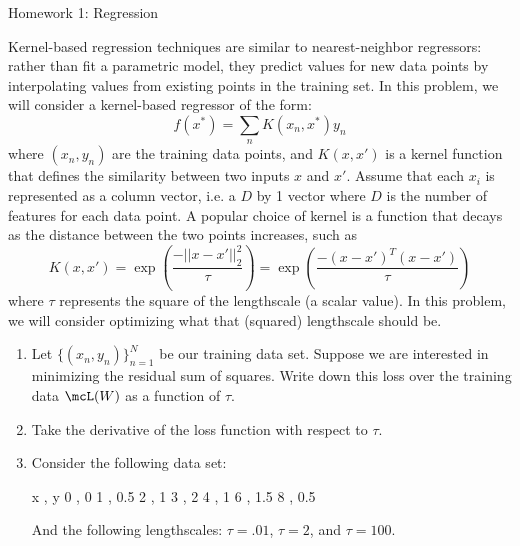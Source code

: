 \documentclass[submit]{harvardml}
\begin{document}
\begin{center}
{\Large Homework 1: Regression}\\
\end{center}



\begin{problem}

Kernel-based regression techniques are similar to nearest-neighbor
regressors: rather than fit a parametric model, they predict values
for new data points by interpolating values from existing points in
the training set.  In this problem, we will consider a kernel-based
regressor of the form:
\begin{equation*}
  f(x^*) = \sum_{n} K(x_n,x^*) y_n 
\end{equation*}
where $(x_n,y_n)$ are the training data points, and $K(x,x')$ is a
kernel function that defines the similarity between two inputs $x$ and
$x'$. Assume that each $x_i$ is represented as a column vector, i.e. a
$D$ by 1 vector where $D$ is the number of features for each data
point. A popular choice of kernel is a function that decays as the
distance between the two points increases, such as
\begin{equation*}
  K(x,x') = \exp\left(\frac{-||x-x'||^2_2}{\tau}\right) = \exp\left(\frac{-(x-x')^T (x-x')}{\tau} \right) 
\end{equation*}
where $\tau$ represents the square of the lengthscale (a scalar value).  In this
problem, we will consider optimizing what that (squared) lengthscale
should be.

\begin{enumerate}

\item Let $\{(x_n,y_n)\}_{n=1}^N$ be our training data set.  Suppose
  we are interested in minimizing the residual sum of squares.  Write
  down this loss over the training data $\mcL(W)$ as a function of $\tau$.

\item Take the derivative of the loss function with respect to $\tau$.

\item Consider the following data set:
\begin{csv}
  x , y
  0 , 0
  1 , 0.5
  2 , 1
  3 , 2
  4 , 1
  6 , 1.5
  8 , 0.5 
\end{csv}
And the following lengthscales: $\tau=.01$, $\tau=2$, and $\tau=100$.


\end{enumerate}
\end{problem}
\end{document}
